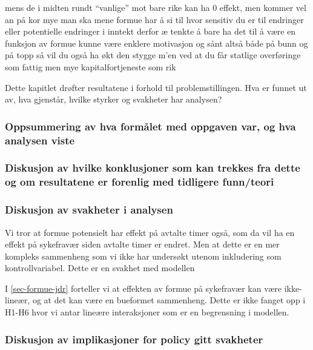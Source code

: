 \documentclass[
  12pt,
  a4paper,
  DIV=11,
  numbers=noendperiod]{scrartcl}
\begin{document}
mens de i midten rundt ``vanlige'' mot bare rike kan ha 0 effekt, men
kommer vel an på kor mye man ska mene formue har å si til hvor sensitiv
du er til endringer eller potentielle endringer i inntekt derfor æ
tenkte å bare ha det til å være en funksjon av formue kunne være enklere
motivasjon og sånt altså både på bunn og på topp så vil du også ha økt
den stygge m'en ved at du får statlige overføringe som fattig men mye
kapitalfortjeneste som rik

Dette kapitlet drøfter resultatene i forhold til problemstillingen. Hva
er funnet ut av, hva gjenstår, hvilke styrker og svakheter har analysen?

\subsubsection{Oppsummering av hva formålet med oppgaven var, og hva
analysen
viste}\label{oppsummering-av-hva-formuxe5let-med-oppgaven-var-og-hva-analysen-viste}

\subsubsection{Diskusjon av hvilke konklusjoner som kan trekkes fra
dette og om resultatene er forenlig med tidligere
funn/teori}\label{diskusjon-av-hvilke-konklusjoner-som-kan-trekkes-fra-dette-og-om-resultatene-er-forenlig-med-tidligere-funnteori}

\subsubsection{Diskusjon av svakheter i
analysen}\label{diskusjon-av-svakheter-i-analysen}

Vi tror at formue potensielt har effekt på avtalte timer også, som da
vil ha en effekt på sykefravær siden avtalte timer er endret. Men at
dette er en mer kompleks sammenheng som vi ikke har undersøkt utenom
inkludering som kontrollvariabel. Dette er en svakhet med modellen

I \autoref{sec-formue-jdr} forteller vi at effekten av formue på
sykefravær kan være ikke-lineær, og at det kan være en bueformet
sammenheng. Dette er ikke fanget opp i H1-H6 hvor vi antar lineære
interaksjoner som er en begrensning i modellen.

\subsubsection{Diskusjon av implikasjoner for policy gitt
svakheter}\label{diskusjon-av-implikasjoner-for-policy-gitt-svakheter}
\end{document}

